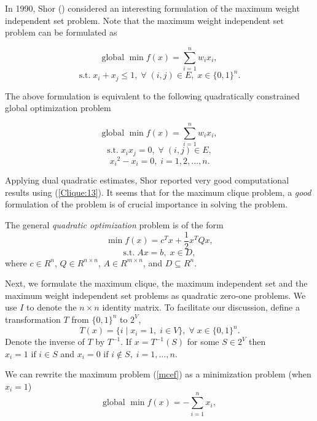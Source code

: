 In 1990, Shor (\cite{Sho90}) considered an interesting
formulation of the maximum weight independent set problem. Note that
the maximum weight independent set problem can be formulated as 


\begin{equation}
\mbox{global } \min f(x) = \sum_{i=1}^{n} w_i x_i,
	\label{Clique:12}
\end{equation}
\[ \mbox{s.t.} \; {x}_{i} + {x}_{j} \leq 1, \; \forall \;
 (i,j) \in E, \; x \in { \{ 0, 1 \} }^{n}. \]

The above formulation is equivalent to the following quadratically
constrained global optimization problem

\begin{equation}
\mbox{global } \min f(x) = \sum_{i=1}^{n} w_i x_i,
	\label{Clique:13}
\end{equation}
\[ \mbox{s.t.} \; {x}_{i}{x}_{j} = 0, \; \forall \; (i,j) \in E, \]
\[ {x_i}^2 - x_i = 0, \; i = 1, 2, ..., n. \]

Applying dual quadratic estimates, Shor reported very good
computational results using (\ref{Clique:13}). It seems that for the
maximum clique problem, a {\em good} formulation of the problem is
of crucial importance in solving the problem. 


The general {\em quadratic optimization} problem is of the form
\begin{equation}
\min f(x) = c^{T} x + \frac{1}{2} x^{T} Qx,
	\label{qo}
\end{equation}
\[ \mbox{s.t.} \; A x = b, \; x \in D, \]
where $c \in R^n$, $Q \in R^{n \times n}$, $A \in R^{m \times n}$,
and $D \subseteq R^{n}$. 


Next, we formulate the maximum clique, the maximum independent set
and the maximum weight independent set problems as quadratic
zero-one problems. We use $I$ to denote the $n\times n$ identity
matrix. To facilitate our discussion, define a transformation $T$
from $\{0,1\}^n$ to $2^V$,
\[ T(x) = \{ i \; | \; x_i = 1, \; i \in V \}, \;
 \forall \; x \in \{0,1\}^n. \]
Denote the inverse of $T$ by $T^{-1}$. If $x = T^{-1}(S)$ for some
$S \in 2^V$ then $x_i = 1 \mbox{ if } i \in S$ and
$x_i = 0 \mbox{ if } i \not \in S, \; i = 1, \ldots, n$.

We can rewrite the maximum problem (\ref{mcef}) as a minimization
problem (when $x_i = 1$)
\begin{equation}
\mbox{global } \min f(x) = - \sum_{i=1}^{n} x_i,
	\label{Clique:1}
\end{equation} 


